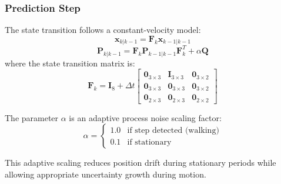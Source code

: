 \documentclass[journal,twocolumn]{IEEEtran}
\begin{document}
\subsubsection{Prediction Step}
The state transition follows a constant-velocity model:
\begin{equation}
    \mathbf{x}_{k|k-1} = \mathbf{F}_k \mathbf{x}_{k-1|k-1}
    \label{eq:ekf_predict_state}
\end{equation}
\begin{equation}
    \mathbf{P}_{k|k-1} = \mathbf{F}_k \mathbf{P}_{k-1|k-1} \mathbf{F}_k^T + \alpha \mathbf{Q}
    \label{eq:ekf_predict_cov}
\end{equation}
where the state transition matrix is:
\begin{equation}
    \mathbf{F}_k = \mathbf{I}_8 + \Delta t \begin{bmatrix}
    \mathbf{0}_{3\times3} & \mathbf{I}_{3\times3} & \mathbf{0}_{3\times2} \\
    \mathbf{0}_{3\times3} & \mathbf{0}_{3\times3} & \mathbf{0}_{3\times2} \\
    \mathbf{0}_{2\times3} & \mathbf{0}_{2\times3} & \mathbf{0}_{2\times2}
    \end{bmatrix}
    \label{eq:transition}
\end{equation}

The parameter $\alpha$ is an adaptive process noise scaling factor:
\begin{equation}
    \alpha = \begin{cases}
    1.0 & \text{if step detected (walking)} \\
    0.1 & \text{if stationary}
    \end{cases}
    \label{eq:adaptive_noise}
\end{equation}

This adaptive scaling reduces position drift during stationary periods while allowing appropriate uncertainty growth during motion.
\end{document}
